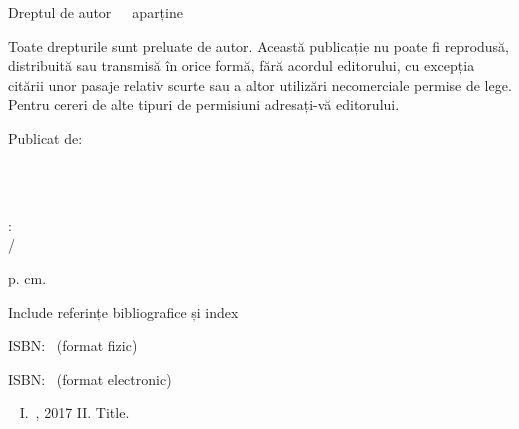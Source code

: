 \bigskip

Dreptul de autor\ \textcopyright\ \TheCopyrightYear\ aparține  \TheAuthor

\bigskip

Toate drepturile sunt preluate de autor. Această publicație nu poate fi reprodusă, distribuită sau transmisă în orice formă, fără acordul editorului, cu excepția citării unor pasaje relativ scurte sau a altor utilizări necomerciale permise de lege. Pentru cereri de alte tipuri de permisiuni adresați-vă editorului.

\bigskip
Publicat de:
  \begin{adjustwidth}{1cm}{1cm}
		\ThePublisher\\
		\ThePublisherAddrA\\
		\ThePublisherAddrB
  \end{adjustwidth}

%

\bigskip

\bigskip
\TheAuthorLNF

\TheMainTitle: \\ \hspace*{10mm}\TheSubTitle / \TheAuthorLNF

p. cm.

Include referințe bibliografice și index

ISBN: \PrintISBN\, (format fizic) 

ISBN: \EbookISBN\, (format electronic)

\TheCIPSubjectHeadings\par\
I. \TheAuthorLNF\,, 2017 II. Title.

\TheLCCN\par
\TheDDSN\hspace*{3cm}
\TheLCPCN\par
\bigskip

	\TheEdition

